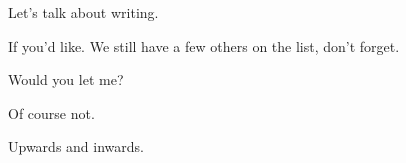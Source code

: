 \noindent Let's talk about writing.

\begin{ally}
If you'd like. We still have a few others on the list, don't forget.
\end{ally}
Would you let me?

\begin{ally}
Of course not.
\end{ally}
Upwards and inwards.
\newpage
